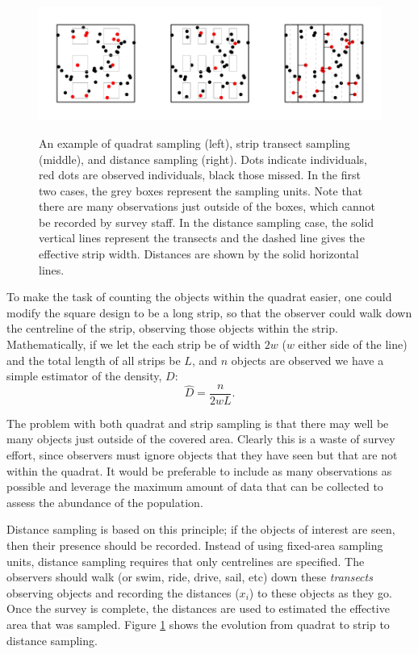 \begin{figure}
\centering
\includegraphics{intro/figs/quadrat-to-ds.pdf}\\
\caption{An example of quadrat sampling (left), strip transect sampling (middle), and distance sampling (right). Dots indicate individuals, red dots are observed individuals, black those missed. In the first two cases, the grey boxes represent the sampling units. Note that there are many observations just outside of the boxes, which cannot be recorded by survey staff. In the distance sampling case, the solid vertical lines represent the transects and the dashed line gives the effective strip width. Distances are shown by the solid horizontal lines.}
\label{quad-to-ds}
\end{figure}

To make the task of counting the objects within the quadrat easier, one could modify the square design to be a long strip, so that the observer could walk down the centreline of the strip, observing those objects within the strip. Mathematically, if we let the each strip be of width $2w$ ($w$ either side of the line) and the total length of all strips be $L$, and $n$ objects are observed we have a simple estimator of the density, $D$:
\begin{equation}
\hat{D}=\frac{n}{2wL}.
\label{ds-simpleD}
\end{equation}

The problem with both quadrat and strip sampling is that there may well be many objects just outside of the covered area. Clearly this is a waste of survey effort, since observers must ignore objects that they have seen but that are not within the quadrat. It would be preferable to include as many observations as possible and leverage the maximum amount of data that can be collected to assess the abundance of the population.

Distance sampling is based on this principle; if the objects of interest are seen, then their presence should be recorded. Instead of using fixed-area sampling units, distance sampling requires that only centrelines are specified. The observers should walk (or swim, ride, drive, sail, etc) down these \textit{transects} observing objects and recording the distances ($x_i$) to these objects as they go. Once the survey is complete, the distances are used to estimated the effective area that was sampled. Figure \ref{quad-to-ds} shows the evolution from quadrat to strip to distance sampling.


